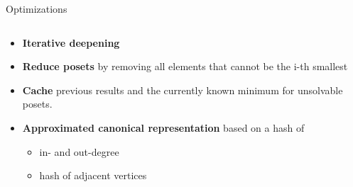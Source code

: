 \begin{frame}{Optimizations}
  \begin{columns}
    \begin{column}{0.6\textwidth}
      \begin{itemize}
        \item<1-> \textbf{Iterative deepening}
        \item<2-> \textbf{Reduce posets} by removing all elements that cannot be the i-th smallest
        \item<3-> \textbf{Cache} previous results and the currently known minimum for unsolvable posets.
        \item<4-> \textbf{Approximated canonical representation} based on a hash of 
        \begin{itemize}
          \item in- and out-degree
          \item hash of adjacent vertices 
        \end{itemize}
      \end{itemize}
    \end{column}

    \begin{column}{0.4\textwidth}
\end{column}
\end{columns}
\end{frame}
